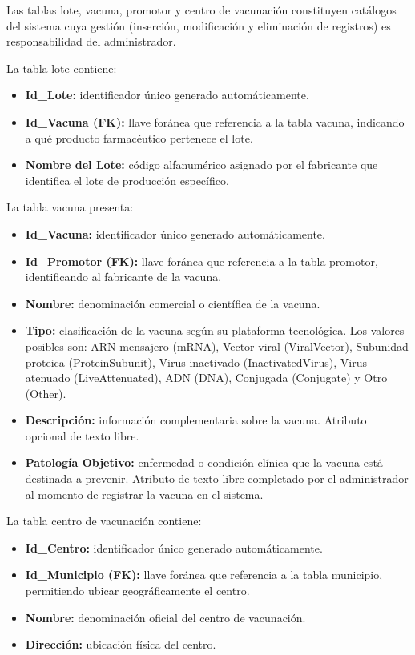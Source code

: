 Las tablas lote, vacuna, promotor y centro de vacunación constituyen catálogos del sistema cuya gestión (inserción, modificación y eliminación de registros) es responsabilidad del administrador.

La tabla lote contiene:

\begin{itemize}
\item \textbf{Id\_Lote:} identificador único generado automáticamente.
\item \textbf{Id\_Vacuna (FK):} llave foránea que referencia a la tabla vacuna, indicando a qué producto farmacéutico pertenece el lote.
\item \textbf{Nombre del Lote:} código alfanumérico asignado por el fabricante que identifica el lote de producción específico.
\end{itemize}


La tabla vacuna presenta:

\begin{itemize}
    \item \textbf{Id\_Vacuna:} identificador único generado automáticamente.
    \item \textbf{Id\_Promotor (FK):} llave foránea que referencia a la tabla promotor, identificando al fabricante de la vacuna.
    \item \textbf{Nombre:} denominación comercial o científica de la vacuna.
    \item \textbf{Tipo:} clasificación de la vacuna según su plataforma tecnológica. Los valores posibles son: ARN mensajero (mRNA), Vector viral (ViralVector), Subunidad proteica (ProteinSubunit), Virus inactivado (InactivatedVirus), Virus atenuado (LiveAttenuated), ADN (DNA), Conjugada (Conjugate) y Otro (Other).
    \item \textbf{Descripción:} información complementaria sobre la vacuna. Atributo opcional de texto libre.
    \item \textbf{Patología Objetivo:} enfermedad o condición clínica que la vacuna está destinada a prevenir. Atributo de texto libre completado por el administrador al momento de registrar la vacuna en el sistema.
\end{itemize}

La tabla centro de vacunación contiene:

\begin{itemize}
\item \textbf{Id\_Centro:} identificador único generado automáticamente.
\item \textbf{Id\_Municipio (FK):} llave foránea que referencia a la tabla municipio, permitiendo ubicar geográficamente el centro.
\item \textbf{Nombre:} denominación oficial del centro de vacunación.
\item \textbf{Dirección:} ubicación física del centro.
\end{itemize}

